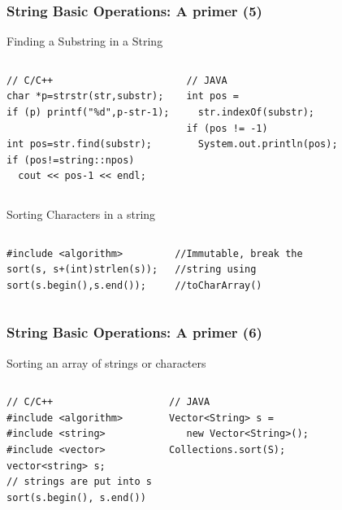 \documentclass{beamer}
\begin{document}
\begin{frame}
  \frametitle{String Basic Operations: A primer (5)}
  {\smaller
    \begin{block}{Finding a Substring in a String}
      \begin{columns}[T]
\begin{verbatim}
// C/C++
char *p=strstr(str,substr);
if (p) printf("%d",p-str-1);

int pos=str.find(substr);
if (pos!=string::npos)
  cout << pos-1 << endl;
\end{verbatim}
\begin{verbatim}
// JAVA
int pos = 
  str.indexOf(substr);
if (pos != -1)
  System.out.println(pos);
\end{verbatim}
      \end{columns}
    \end{block}
    \begin{block}{Sorting Characters in a string}
      \begin{columns}[T]
\begin{verbatim}
#include <algorithm>
sort(s, s+(int)strlen(s));
sort(s.begin(),s.end());
\end{verbatim}
\begin{verbatim}
//Immutable, break the 
//string using 
//toCharArray()
\end{verbatim}
      \end{columns}
    \end{block}
  }
\end{frame}

\begin{frame}
  \frametitle{String Basic Operations: A primer (6)}
  {\smaller
    \begin{block}{Sorting an array of strings or characters}
      \begin{columns}[T]
\begin{verbatim}
// C/C++
#include <algorithm>
#include <string>
#include <vector>
vector<string> s;
// strings are put into s
sort(s.begin(), s.end())
\end{verbatim}
\begin{verbatim}
// JAVA
Vector<String> s = 
   new Vector<String>();
Collections.sort(S);

\end{verbatim}
      \end{columns}
    \end{block}
  }
\end{frame}
\end{document}
